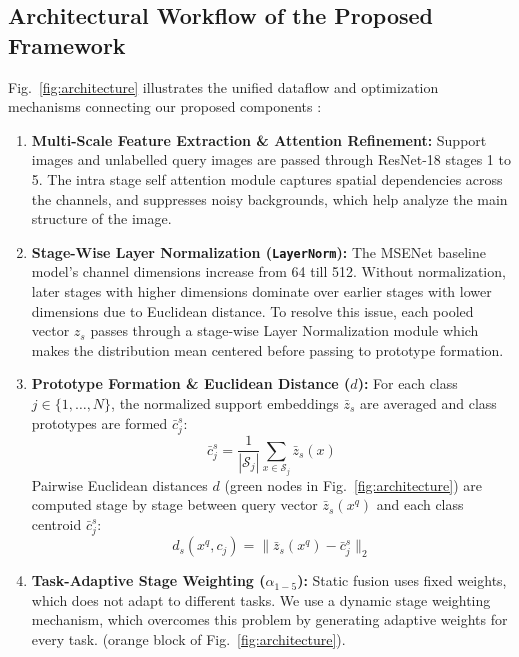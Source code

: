 \documentclass[conference]{IEEEtran}
\begin{document}
\subsection{Architectural Workflow of the Proposed Framework}
Fig.~\ref{fig:architecture} illustrates the unified dataflow and optimization mechanisms connecting our proposed components :
\begin{enumerate}
    \item \textbf{Multi-Scale Feature Extraction \& Attention Refinement:} Support images and unlabelled query images are passed through ResNet-18 stages 1 to 5. The intra stage self attention module captures spatial dependencies across the channels, and suppresses noisy backgrounds, which help analyze the main structure of the image.
    \item \textbf{Stage-Wise Layer Normalization (\texttt{LayerNorm}):} The MSENet baseline model's channel dimensions increase from 64 till 512. Without normalization, later stages with higher dimensions dominate over earlier stages with lower dimensions due to Euclidean distance. To resolve this issue, each pooled vector $z_s$ passes through a stage-wise Layer Normalization module which makes the distribution mean centered before passing to prototype formation.
    \item \textbf{Prototype Formation \& Euclidean Distance ($d$):} For each class $j \in \{1, \dots, N\}$, the normalized support embeddings $\bar{z}_s$ are averaged and class prototypes are formed $\bar{c}_j^s$:
    \begin{equation}
        \bar{c}_j^s = \frac{1}{|\mathcal{S}_j|} \sum_{x \in \mathcal{S}_j} \bar{z}_s(x)
    \end{equation}
    Pairwise Euclidean distances $d$ (green nodes in Fig.~\ref{fig:architecture}) are computed stage by stage between query vector $\bar{z}_s(x^q)$ and each class centroid $\bar{c}_j^s$:
    \begin{equation}
        d_s(x^q, c_j) = \| \bar{z}_s(x^q) - \bar{c}_j^s \|_2
    \end{equation}
    \item \textbf{Task-Adaptive Stage Weighting ($\alpha_{1-5}$):} Static fusion uses fixed weights, which does not adapt to different tasks. We use a dynamic stage weighting mechanism, which overcomes this problem by generating adaptive weights for every task. (orange block of Fig.~\ref{fig:architecture}).
    

\end{enumerate}
\end{document}
